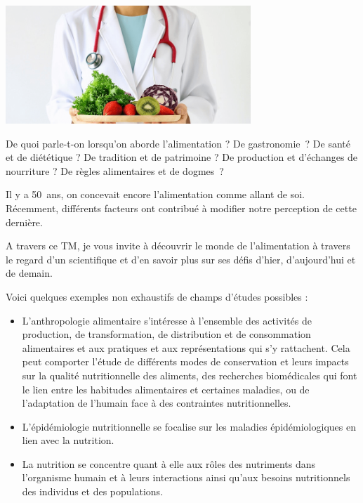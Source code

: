 \documentclass[
  10pt,
  french,
  a5paper,
  openany]{book}
\providecommand{\tightlist}{%
  \setlength{\itemsep}{0pt}\setlength{\parskip}{0pt}}
\begin{document}
\begin{center}
\includegraphics[width=\textwidth,height=12em]{images/les-defis-de-lalimentation.png}

\end{center}

De quoi parle-t-on lorsqu'on aborde l'alimentation ? De gastronomie~? De santé et de diététique ? De tradition et de patrimoine ? De production et d'échanges de nourriture ? De règles alimentaires et de dogmes~?

Il y a 50~ans, on concevait encore l'alimentation comme allant de soi. Récemment, différents facteurs ont contribué à modifier notre perception de cette dernière.

A travers ce TM, je vous invite à découvrir le monde de l'alimentation à travers le regard d'un scientifique et d'en savoir plus sur ses défis d'hier, d'aujourd'hui et de demain. ~

Voici quelques exemples non exhaustifs de champs d'études possibles :

\begin{itemize}
\tightlist
\item
  L'anthropologie alimentaire s'intéresse à l'ensemble des activités de production, de transformation, de distribution et de consommation alimentaires et aux pratiques et aux représentations qui s'y rattachent. Cela peut comporter l'étude de différents modes de conservation et leurs impacts sur la qualité nutritionnelle des aliments, des recherches biomédicales qui font le lien entre les habitudes alimentaires et certaines maladies, ou de l'adaptation de l'humain face à des contraintes nutritionnelles.
\item
  L'épidémiologie nutritionnelle se focalise sur les maladies épidémiologiques en lien avec la nutrition.
\item
  La nutrition se concentre quant à elle aux rôles des nutriments dans l'organisme humain et à leurs interactions ainsi qu'aux besoins nutritionnels des individus et des populations.
\end{itemize}
\end{document}
